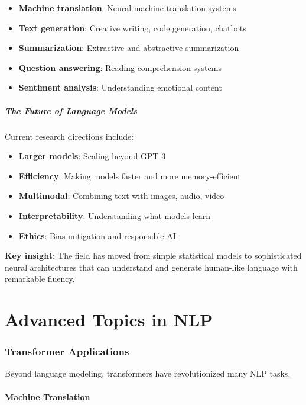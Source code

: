 \documentclass[11pt,a4paper]{article}
\theoremstyle{definition}
\theoremstyle{plain}
\theoremstyle{remark}
\begin{document}
\begin{itemize}
    \item \textbf{Machine translation}: Neural machine translation systems
    \item \textbf{Text generation}: Creative writing, code generation, chatbots
    \item \textbf{Summarization}: Extractive and abstractive summarization
    \item \textbf{Question answering}: Reading comprehension systems
    \item \textbf{Sentiment analysis}: Understanding emotional content
\end{itemize}

\subsubsection{The Future of Language Models}

Current research directions include:

\begin{itemize}
    \item \textbf{Larger models}: Scaling beyond GPT-3
    \item \textbf{Efficiency}: Making models faster and more memory-efficient
    \item \textbf{Multimodal}: Combining text with images, audio, video
    \item \textbf{Interpretability}: Understanding what models learn
    \item \textbf{Ethics}: Bias mitigation and responsible AI
\end{itemize}

\textbf{Key insight:} The field has moved from simple statistical models to sophisticated neural architectures that can understand and generate human-like language with remarkable fluency.

\part{Advanced Topics in NLP}

\section{Transformer Applications}

Beyond language modeling, transformers have revolutionized many NLP tasks.

\subsection{Machine Translation}
\end{document}

